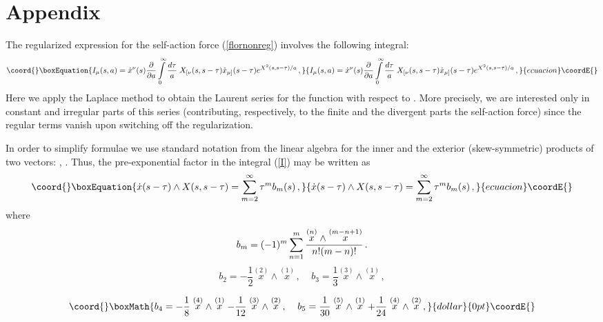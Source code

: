 \documentclass[a4paper,12pt]{article}
\begin{document}
\section*{Appendix}

The regularized expression for the self-action force
(\ref{flornonreg}) involves the following integral:
\begin{equation}\coord{}\boxEquation{\label{I}
I_{\mu}(s,a)=\dot{x}^\nu(s)\frac{\partial}{\partial
a}\int\limits_0^\infty \frac{d\tau}{a}\;
X_{[\nu}(s,s-\tau)\dot{x}_{\mu] }(s-\tau ){ e^{X^2(s,s-\tau)/a}}
\,,
}{I_{\mu}(s,a)=\dot{x}^\nu(s)\frac{\partial}{\partial
a}\int\limits_0^\infty \frac{d\tau}{a}\;
X_{[\nu}(s,s-\tau)\dot{x}_{\mu] }(s-\tau ){ e^{X^2(s,s-\tau)/a}}
\,,
}{ecuacion}\coordE{}\end{equation}
Here we apply the Laplace method to obtain the Laurent series for
the function \coordHE{} with respect to \coordHE{}. More precisely,
we are interested only in  constant and  irregular
 parts of this series (contributing, respectively, to the
finite and the divergent parts the self-action force) since the
regular terms vanish upon switching off the regularization.

In order to simplify formulae we use standard notation from the
linear algebra for the inner and the exterior (skew-symmetric)
products of two vectors: \coordHE{}, \coordHE{}. Thus, the pre-exponential  factor in the
integral (\ref{I}) may be written as
\begin{equation}\coord{}\boxEquation{\label{b}
\dot x(s-\tau)\wedge X(s,s-\tau)=\sum_{m=2}^{\infty}\tau^m
b_m(s)\,,
}{\dot x(s-\tau)\wedge X(s,s-\tau)=\sum_{m=2}^{\infty}\tau^m
b_m(s)\,,
}{ecuacion}\coordE{}\end{equation}
where
$$
b_m=(-1)^m\sum_{n=1}^m\frac{\stackrel{(n)}{x}\wedge \stackrel{(m-n+1)}{x}}{%
n!(m-n)!}\,.
$$\coord{}\coordE{}$$
b_2=-\frac12 \stackrel{(2)}{x}\wedge \stackrel{(1)}{x}\,,\;\;\;\;
b_3=\frac 13\stackrel{(3)}{x}\wedge \stackrel{(1)}{x}\,,
$$

$$\coord{}\boxMath{
b_4=-\frac 18\stackrel{(4)}{x}\wedge
\stackrel{(1)}{x}-\frac 1{12}\stackrel{(3)}{x}\wedge
\stackrel{(2)}{x}\,,\;\;\;\; b_5=\frac
1{30}\stackrel{(5)}{x}\wedge \stackrel{(1)}{x}+\frac 1{24}
\stackrel{(4)}{x}\wedge \stackrel{(2)}{x}\,,
}{dollar}{0pt}\coordE{}$$
\end{document}
